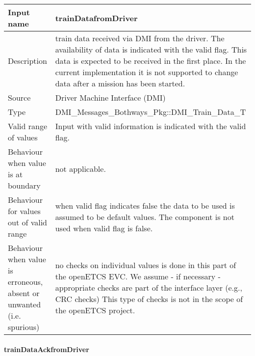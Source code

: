 \begin{longtable}{p{}p{}}
\toprule
Input name				& trainDatafromDriver \\
\midrule
Description				& train data received via DMI from the driver. The availability of data is indicated with the valid flag. This data is expected to be received in the first place. In the current implementation it is not supported to change data after a mission has been started.\\
\midrule
Source					& Driver Machine Interface (DMI) \\ 
\midrule
Type					& DMI\_Messages\_Bothways\_Pkg::DMI\_Train\_Data\_T \\
\midrule
Valid range of values	& Input with valid information is indicated with the valid flag. \\
\midrule
Behaviour when value is at boundary	& not applicable.\\
\midrule
Behaviour for values out of valid range	& when valid flag indicates false the data to be used is assumed to be default values. The component is not used when valid flag is false.\\
\midrule
Behaviour when value is erroneous, absent or unwanted (i.e. spurious) & no checks on individual values is done in this part of the openETCS EVC. We assume - if necessary - appropriate checks are part of the interface layer (e.g., CRC checks) This type of checks is not in the scope of the openETCS project.\\
\bottomrule

\end{longtable}

\paragraph{trainDataAckfromDriver}


